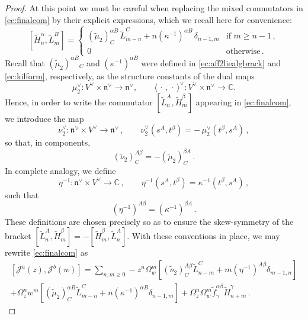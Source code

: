 \documentclass[11pt]{amsart}
\newcommand{\C}{{\mathbb C}}
\newcommand{\tL}{{\tilde L}}
\newcommand{\tH}{{\tilde H}}
\newcommand{\CJ}{{\mathcal J}}
\newcommand{\fn}{\mathfrak{n}}
\numberwithin{equation}{section}
\numberwithin{figure}{section}
\numberwithin{table}{section}
\theoremstyle{thm}
\numberwithin{equation}{subsection}
\theoremstyle{definition}
\theoremstyle{rem}
\begin{document}
\begin{proof}
At this point we must be careful when replacing the mixed commutators in \eqref{ec:finalcom} by their explicit expressions, which we recall here for convenience:
\begin{equation}
\label{ec:higherpossbrack4}
[\tH_n^\alpha,\tL_m^B]
=
\begin{cases}
(\tilde \mu_2)^{\alpha B}_C\,\tL_{m-n}^C
+ n(\kappa^{-1})^{\alpha B}\,\delta_{n-1,m}
& \text{if } m \ge n-1 \,,\\[0.3em]
0 & \text{otherwise} \,.
\end{cases}
\end{equation}
Recall that $(\tilde\mu_2)^{\alpha B}{}_C$ and $(\kappa^{-1})^{\alpha B}$ were defined in
\eqref{ec:aff2liealgbrack} and \eqref{ec:kilform}, respectively, as the structure constants of the dual maps
\begin{equation}
  \mu_2^\vee : V^\vee \times \fn^\vee \to \fn^\vee,
  \qquad
  \langle\,\cdot\,,\,\cdot\,\rangle^\vee : V^\vee \times \fn^\vee \to \C .
\end{equation}
Hence, in order to write the commutator
$[\tL_n^A,\tH_m^\beta]$ appearing in \eqref{ec:finalcom}, we introduce
the map
\begin{equation}
\nu_2^\vee : \fn^\vee \times V^\vee \to \fn^\vee \,,
\qquad
\nu_2^\vee(s^A,t^\beta)
= -\,\mu_2^\vee(t^\beta,s^A)\,,
\end{equation}
so that, in components,
\[
(\tilde \nu_2)^{A\beta}_C
= -(\tilde \mu_2)^{\beta A}_C \,.
\]
In complete analogy, we define
\begin{equation}
\eta^{-1} : \fn^\vee \times V^\vee \to \mathbb{C} \,,
\qquad
\eta^{-1}(s^A,t^\beta)
= \kappa^{-1}(t^\beta,s^A)\,,
\end{equation}
such that
\[
(\eta^{-1})^{A\beta}
= (\kappa^{-1})^{\beta A} \,.
\]
These definitions are chosen precisely so as to ensure the skew-symmetry of the bracket $[\tL_n^A,\tH_m^\beta]=-[\tH_m^\beta,\tL_n^A]$. With these conventions in place, we may rewrite \eqref{ec:finalcom} as
\begin{multline}
\label{ec:expparacomp}
        [\CJ^a(z),\CJ^b(w)]=\sum_{n,m\geq 0}-z^n\Omega_w^m\left[(\tilde{\nu}_2)^{A\beta}_C\tL_{n-m}^C + m(\eta^{-1})^{A\beta }\delta_{m-1,n}\right]\\
        +\Omega_z^nw^m\left[(\tilde{\mu}_2)^{\alpha B}_C\tL_{m-n}^C + n(\kappa^{-1})^{\alpha B}\delta_{n-1,m}\right] + \Omega_z^n\Omega_w^m \tilde{f}^{\alpha\beta}_\gamma \tH_{n+m}^\gamma\,.
\end{multline}


\medskip


\end{proof}
\end{document}

